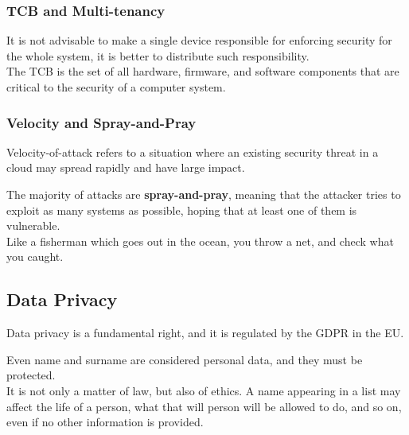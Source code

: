 \subsubsection{TCB and Multi-tenancy}
It is not advisable to make a single device responsible for enforcing security for the whole system, it is better to distribute such responsibility.\\
The TCB is the set of all hardware, firmware, and software components that are critical to the security of a computer system.

\subsubsection{Velocity and Spray-and-Pray}
Velocity-of-attack refers to a situation where an existing security threat in a cloud may spread rapidly and have large impact.

The majority of attacks are \textbf{spray-and-pray}, meaning that the attacker tries to exploit as many systems as possible, hoping that at least one of them is vulnerable.\\
Like a fisherman which goes out in the ocean, you throw a net, and check what you caught.

\subsection{Data Privacy}
Data privacy is a fundamental right, and it is regulated by the GDPR in the EU.

Even name and surname are considered personal data, and they must be protected.\\
It is not only a matter of law, but also of ethics.
A name appearing in a list may affect the life of a person, what that will person will be allowed to do, and so on, even if no other information is provided.



